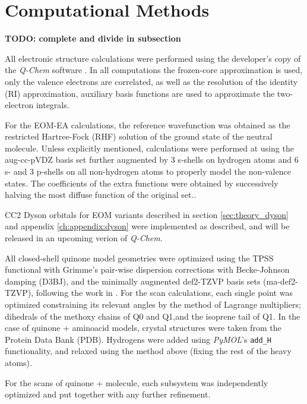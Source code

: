 \chapter{Computational Methods}\label{ch:methods}

\textbf{TODO: complete and divide in subsection}

All electronic structure calculations were performed using the developer's copy of the \textit{Q-Chem} software \cite{QChem5}. In all computations the frozen-core
approximation is used, only the valence electrons are correlated, as well as the resolution of the identity (RI) approximation, auxiliary basis functions are used to approximate the two-electron integrals\cite{hattig2000cc2}.

For the EOM-EA calculations, the reference wavefunction was obtained as the restricted Hartree-Fock (RHF) solution of the ground state of the neutral molecule. Unless explicitly mentioned, calculations were performed at using the aug-cc-pVDZ basis set \cite{dunning1989gaussian} further augmented by 3 s-shells on hydrogen atoms and 6 s- and 3 p-shells on all non-hydrogen atoms \cite{paran2024performance} to properly model the non-valence states. The coefficients of the extra functions were obtained by successively halving the most diffuse function of the original set.\label{sec:methods:basis}.

CC2 Dyson orbitals for EOM variants described in section \ref{sec:theory_dyson} and appendix \ref{ch:appendix:dyson} were implemented as described, and will be released in an upcoming verion of \textit{Q-Chem}.

All closed-shell quinone model geometries were optimized using the TPSS functional\cite{tao2003climbing} with Grimme's pair-wise dispersion corrections with Becke-Johnson damping (D3BJ)\cite{grimme2011effect}, and the minimally augmented\cite{zheng2011minimally} def2-TZVP basis sets\cite{weigend2005balanced} (ma-def2-TZVP), following the work in \cite{schulz2018systematic}. For the scan calculations, each single point was optimized constraining its relevant angles by the method of Lagrange multipliers; dihedrals of the methoxy chains of Q0 and Q1,and the isoprene tail of Q1.
In the case of quinone + aminoacid models, crystal structures were taken from the Protein Data Bank (PDB). Hydrogens were added using \textit{PyMOL}'s \cite{PyMOL} \texttt{add\_H}  functionality, and relaxed using the method above (fixing the rest of the heavy atoms).

For the scans of quinone + molecule, each subsystem was independently optimized and put together with any further refinement.

